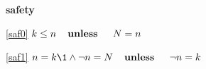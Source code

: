 \textbf{safety}
\begin{block}
\item[ \eqref{saf0} ]{$k \le n  \textbf{\quad unless \quad} N = n $} %
\item[ \eqref{saf1} ]{$n = k \1\land \neg n = N  \textbf{\quad unless \quad} \neg n = k $} %
\end{block}
